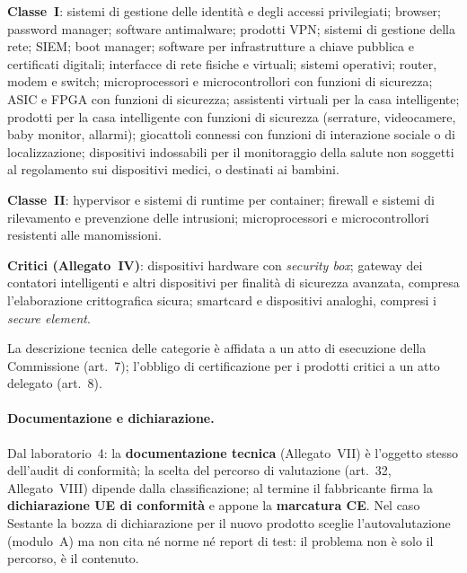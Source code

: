 \begin{integrazione}
\textbf{Classe~I}: sistemi di gestione delle identità e degli accessi privilegiati; browser; password
manager; software antimalware; prodotti VPN; sistemi di gestione della rete; SIEM; boot manager; software
per infrastrutture a chiave pubblica e certificati digitali; interfacce di rete fisiche e virtuali;
sistemi operativi; router, modem e switch; microprocessori e microcontrollori con funzioni di sicurezza;
ASIC e FPGA con funzioni di sicurezza; assistenti virtuali per la casa intelligente; prodotti per la casa
intelligente con funzioni di sicurezza (serrature, videocamere, baby monitor, allarmi); giocattoli
connessi con funzioni di interazione sociale o di localizzazione; dispositivi indossabili per il
monitoraggio della salute non soggetti al regolamento sui dispositivi medici, o destinati ai bambini.

\textbf{Classe~II}: hypervisor e sistemi di runtime per container; firewall e sistemi di rilevamento e
prevenzione delle intrusioni; microprocessori e microcontrollori resistenti alle manomissioni.

\textbf{Critici (Allegato~IV)}: dispositivi hardware con \emph{security box}; gateway dei contatori
intelligenti e altri dispositivi per finalità di sicurezza avanzata, compresa l'elaborazione
crittografica sicura; smartcard e dispositivi analoghi, compresi i \emph{secure element}.

La descrizione tecnica delle categorie è affidata a un atto di esecuzione della Commissione (art.~7);
l'obbligo di certificazione per i prodotti critici a un atto delegato (art.~8).
\end{integrazione}

\paragraph{Documentazione e dichiarazione.} Dal laboratorio~4: la \textbf{documentazione tecnica}
(Allegato~VII) è l'oggetto stesso dell'audit di conformità; la scelta del percorso di valutazione
(art.~32, Allegato~VIII) dipende dalla classificazione; al termine il fabbricante firma la
\textbf{dichiarazione UE di conformità} e appone la \textbf{marcatura CE}. Nel caso Sestante la bozza di
dichiarazione per il nuovo prodotto sceglie l'autovalutazione (modulo~A) ma non cita né norme né report
di test: il problema non è solo il percorso, è il contenuto.


